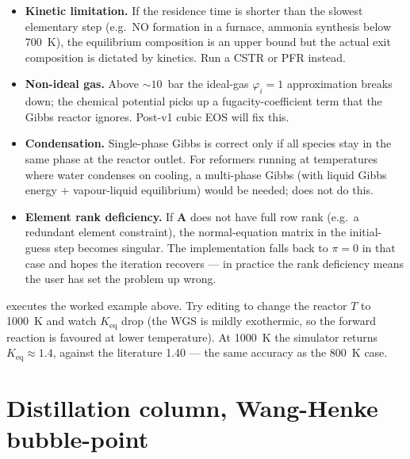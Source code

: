 \documentclass[11pt,a4paper]{article}
\begin{document}
\begin{itemize}[leftmargin=*,nosep]
  \item \textbf{Kinetic limitation.}  If the residence time is
        shorter than the slowest elementary step (e.g.\ NO formation
        in a furnace, ammonia synthesis below 700~K), the equilibrium
        composition is an upper bound but the actual exit composition
        is dictated by kinetics.  Run a CSTR or PFR instead.
  \item \textbf{Non-ideal gas.}  Above $\sim 10$~bar the
        ideal-gas $\varphi_i = 1$ approximation breaks down; the
        chemical potential picks up a fugacity-coefficient term that
        the Gibbs reactor ignores.  Post-v1 cubic EOS will fix
        this.
  \item \textbf{Condensation.}  Single-phase Gibbs is correct only if
        all species stay in the same phase at the reactor outlet.
        For reformers running at temperatures where water condenses
        on cooling, a multi-phase Gibbs (with liquid Gibbs energy +
        vapour-liquid equilibrium) would be needed; does not
        do this.
  \item \textbf{Element rank deficiency.}  If $\mathbf{A}$ does not
        have full row rank (e.g.\ a redundant element constraint),
        the normal-equation matrix in the initial-guess step becomes
        singular.  The implementation falls back to $\pi = 0$ in that
        case and hopes the iteration recovers --- in practice the
        rank deficiency means the user has set the problem up wrong.
\end{itemize}

\begin{tutoriallink}
 executes the
worked example above.  Try editing
 to change the reactor $T$ to 1000~K and
watch $K_{\mathrm{eq}}$ drop (the WGS is mildly exothermic, so the
forward reaction is favoured at lower temperature).  At 1000~K the
simulator returns $K_{\mathrm{eq}} \approx 1.4$, against the
literature 1.40 --- the same accuracy as the 800~K case.
\end{tutoriallink}

\section{Distillation column, Wang-Henke bubble-point}\label{ch:distillation}
\end{document}
